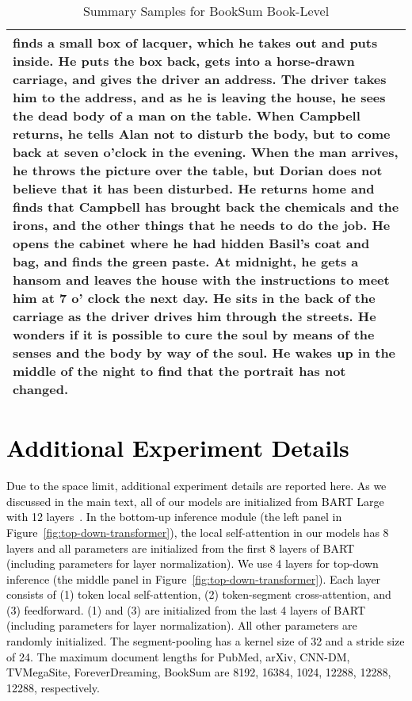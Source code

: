 \begin{table}[!htbp]
\begin{tabular}{p{\linewidth}}
finds a small box of lacquer, which he takes out and puts inside. He puts the box back, gets into a horse-drawn carriage, and gives the driver an address. The driver takes him to the address, and as he is leaving the house, he sees the dead body of a man on the table. When Campbell returns, he tells Alan not to disturb the body, but to come back at seven o'clock in the evening. When the man arrives, he throws the picture over the table, but Dorian does not believe that it has been disturbed. He returns home and finds that Campbell has brought back the chemicals and the irons, and the other things that he needs to do the job. He opens the cabinet where he had hidden Basil's coat and bag, and finds the green paste. At midnight, he gets a hansom and leaves the house with the instructions to meet him at 7 o' clock the next day. He sits in the back of the carriage as the driver drives him through the streets. He wonders if it is possible to cure the soul by means of the senses and the body by way of the soul. He wakes up in the middle of the night to find that the portrait has not changed.
    \\
    \bottomrule
    \end{tabular}
    \caption{
    Summary Samples for BookSum Book-Level
    }
\end{table}

\clearpage
\section{\textcolor{black}{Additional Experiment Details}}
\textcolor{black}{
Due to the space limit, additional experiment details are reported here. As we discussed in the main text, all of our models are initialized from BART Large with 12 layers~\citep{lewis-etal-2020-bart}. In the bottom-up inference module (the left panel in Figure~\ref{fig:top-down-transformer}), the local self-attention in our models has 8 layers and all parameters are initialized from the first 8 layers of BART (including parameters for layer normalization). We use 4 layers for top-down inference (the middle panel in Figure~\ref{fig:top-down-transformer}). Each layer consists of (1) token local self-attention, (2) token-segment cross-attention, and (3) feedforward. (1) and (3) are initialized from the last 4 layers of BART (including parameters for layer normalization). All other parameters are randomly initialized. The segment-pooling has a kernel size of 32 and a stride size of 24. The maximum document lengths for PubMed, arXiv, CNN-DM, TVMegaSite, ForeverDreaming, BookSum are 8192, 16384, 1024, 12288, 12288, 12288, respectively.
}

